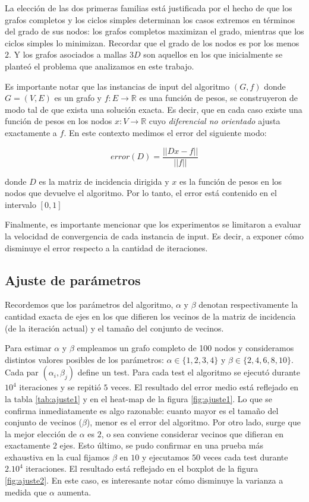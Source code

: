\documentclass[10pt, a4paper, twocolumn]{article} %
\begin{document}
La elección de las dos primeras familias está justificada por el hecho 
de que los grafos completos y los ciclos simples determinan los casos 
extremos en términos del grado de sus nodos: los grafos completos 
maximizan el grado, mientras que los ciclos simples lo minimizan. 
Recordar que el grado de los nodos es por los menos $2$. Y los grafos 
asociados a mallas $3D$ son aquellos en los que inicialmente se planteó 
el problema que analizamos en este trabajo.

\smallskip

Es importante notar que las instancias de input del algoritmo $(G,f)$ 
donde $G=(V,E)$ es un grafo y $f: E \rightarrow \mathbb{R}$ es una 
función de pesos, se construyeron de modo tal de que exista una 
solución exacta. Es decir, que en cada caso existe una función de pesos 
en los nodos $x: V \rightarrow \mathbb{R}$ cuyo \textit{diferencial no 
orientado} ajusta exactamente a $f$. En este contexto medimos el error 
del siguiente modo:

$$error(D) = \frac{||Dx-f||}{||f||}$$

donde $D$ es la matriz de incidencia dirigida y $x$ es la función de 
pesos en los nodos que devuelve el algoritmo. Por lo tanto, el error 
está contenido en el intervalo $[0,1]$

\smallskip

Finalmente, es importante mencionar que los experimentos se limitaron a 
evaluar la velocidad de convergencia de cada instancia de input. Es 
decir, a exponer cómo disminuye el error respecto a la cantidad de 
iteraciones.

\subsection{Ajuste de parámetros}

Recordemos que los parámetros del algoritmo, $\alpha$ y $\beta$ denotan 
respectivamente la cantidad exacta de ejes en los que difieren los 
vecinos de la matriz de incidencia (de la iteración actual) y el tamaño 
del conjunto de vecinos.

\smallskip

Para estimar $\alpha$ y $\beta$ empleamos un grafo completo de 100 
nodos y consideramos distintos valores posibles de los parámetros: 
$\alpha \in \{1,2,3,4\}$ y $\beta \in \{2,4,6,8,10\}$. Cada par 
$(\alpha_i, \beta_j)$ define un test. Para cada test el algoritmo se 
ejecutó durante $10^4$ iteraciones y se repitió $5$ veces. El resultado 
del error medio está reflejado en la tabla \ref{tab:ajuste1} y en el 
heat-map de la figura \ref{fig:ajuste1}. Lo que se confirma 
inmediatamente es algo razonable: cuanto mayor es el tamaño del 
conjunto de vecinos ($\beta$), menor es el error del algoritmo. Por 
otro lado, surge que la mejor elección de $\alpha$ es $2$, o sea 
conviene considerar vecinos que difieran en exactamente $2$ ejes. Esto 
último, se pudo confirmar en una prueba más exhaustiva en la cual 
fijamos $\beta$ en $10$ y ejecutamos $50$ veces cada test durante 
$2 . 10^4$ iteraciones. El resultado está reflejado en el boxplot de la 
figura \ref{fig:ajuste2}. En este caso, es interesante notar cómo 
disminuye la varianza a medida que $\alpha$ aumenta.
\end{document}
